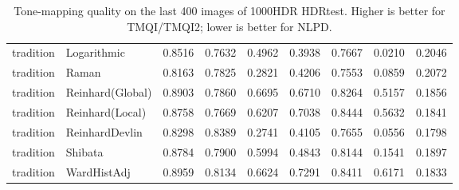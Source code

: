 \begin{table}[t]
\begin{tabular}{llccccccc}
tradition & Logarithmic & 0.8516 & 0.7632 & 0.4962 & 0.3938 & 0.7667 & 0.0210 & 0.2046 \\
tradition & Raman & 0.8163 & 0.7825 & 0.2821 & 0.4206 & 0.7553 & 0.0859 & 0.2072 \\
tradition & Reinhard(Global) & 0.8903 & 0.7860 & 0.6695 & 0.6710 & 0.8264 & 0.5157 & 0.1856 \\
tradition & Reinhard(Local) & 0.8758 & 0.7669 & 0.6207 & 0.7038 & 0.8444 & 0.5632 & 0.1841 \\
tradition & ReinhardDevlin & 0.8298 & 0.8389 & 0.2741 & 0.4105 & 0.7655 & 0.0556 & 0.1798 \\
tradition & Shibata & 0.8784 & 0.7900 & 0.5994 & 0.4843 & 0.8144 & 0.1541 & 0.1897 \\
tradition & WardHistAdj & 0.8959 & 0.8134 & 0.6624 & 0.7291 & 0.8411 & 0.6171 & 0.1833 \\
\bottomrule
\end{tabular}
\caption{Tone-mapping quality on the last 400 images of 1000HDR HDRtest. Higher is better for TMQI/TMQI2; lower is better for NLPD.}
\label{tab:tip_tmo_1000hdr}
\end{table}
